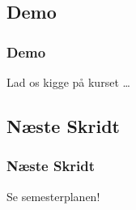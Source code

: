 \documentclass[t, aspectratio=169]{beamer}
\begin{document}
\subsection{Demo}
\begin{frame}[fragile]
  \frametitle{Demo}
  \vspace{30mm}
  \begin{center}
    Lad os kigge på kurset \ldots
  \end{center}
\end{frame}

\subsection{Næste Skridt}
\begin{frame}[fragile]
  \frametitle{Næste Skridt}
  \vspace{1mm}
  Se semesterplanen!
  
  
\end{frame}
\end{document}
